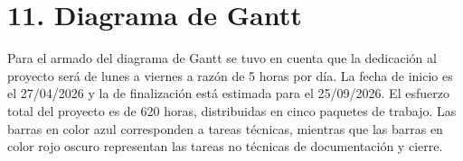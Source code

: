 \documentclass[
11pt, %
]{charter}
\begin{document}
\vspace*{\fill}


\section{11. Diagrama de Gantt}
\label{sec:gantt}

Para el armado del diagrama de Gantt se tuvo en cuenta que la dedicaci\'{o}n al proyecto
ser\'{a} de lunes a viernes a raz\'{o}n de 5 horas por d\'{i}a. La fecha de inicio es el
27/04/2026 y la de finalizaci\'{o}n est\'{a} estimada para el 25/09/2026.
El esfuerzo total del proyecto es de 620 horas, distribuidas en cinco paquetes de trabajo.
Las barras en color azul corresponden a tareas t\'{e}cnicas, mientras que las barras
en color rojo oscuro representan las tareas no t\'{e}cnicas de documentaci\'{o}n y cierre.
\end{document}
